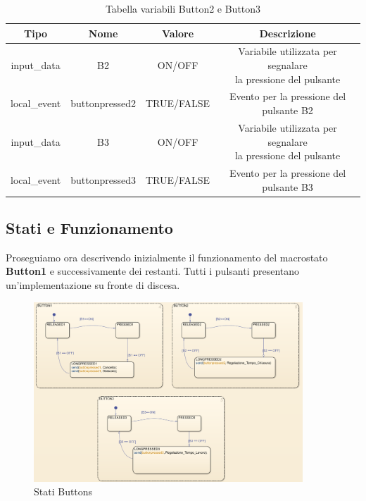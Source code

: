             \begin{table}[H]
                \centering
                    \begin{tabular}{ | c | c | c | c |} 
                        \hline
                        \textbf{Tipo} & \textbf{Nome} & \textbf{Valore} & \textbf{Descrizione} \\ 
                        \hline
                        input\_data & B2 & ON/OFF & \makecell{Variabile utilizzata per segnalare \\ la pressione del pulsante} \\ 
                        \hline
                        local\_event & buttonpressed2 & TRUE/FALSE & Evento per la pressione del pulsante B2 \\ 
                        \hline
                        input\_data & B3 & ON/OFF & \makecell{Variabile utilizzata per segnalare \\ la pressione del pulsante} \\ 
                        \hline
                        local\_event & buttonpressed3 & TRUE/FALSE & Evento per la pressione del pulsante B3 \\ 
                        \hline
                    \end{tabular}
                \caption{Tabella variabili Button2 e Button3}
            \end{table}

        \subsection{Stati e Funzionamento}
            Proseguiamo ora descrivendo inizialmente il funzionamento del macrostato \textbf{Button1} e successivamente dei restanti. Tutti i pulsanti  presentano un'implementazione su fronte di discesa.

            \begin{figure}[H]
                \centering
                \includegraphics[width=0.9\textwidth]{figures/buttons.png}
                \caption{Stati Buttons}
                \label{buttons}
            \end{figure}

